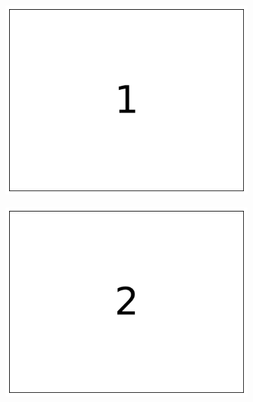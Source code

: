 \begin{figure}[H] %
\captionsetup[subfigure]{justification=centering}
\centering
\begin{subfigure}{.15\textwidth}
    \centering
    \includegraphics[width=\linewidth]{figures/layout_1.pdf}
\end{subfigure}
%
\begin{subfigure}{.15\textwidth}
    \centering
    \includegraphics[width=\linewidth]{figures/layout_2.pdf}
\end{subfigure}
%
\begin{subfigure}{.15\textwidth}
    \centering

\end{subfigure}
\end{figure}

